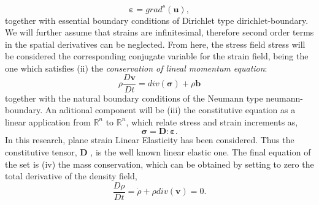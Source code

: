 \documentclass[preprint,12pt,a4paper]{elsarticle}
\newcommand{\vect}[1]{
  \ensuremath{\mathbf{{#1}}}
}
\newcommand{\tens}[1]{
  \ensuremath{\mathbf{{#1}}}
}
\newcommand{\Div}[1]{
  \ensuremath{div({#1})}
}
\newcommand\GradS[1]{grad^s({#1})}
\begin{document}
\begin{equation}
  \label{eq:Compatibility-equation}
  \tens{\varepsilon} = \GradS{\vect{u}},
\end{equation}
together with essential boundary conditions of Dirichlet type
\gls{dirichlet-boundary}. We will further assume that strains are
infinitesimal, therefore second order terms
in the spatial derivatives can be neglected. From here, the
stress field \gls{stress} will be considered the corresponding
conjugate variable for the strain field, being the one which
satisfies (ii) the \textit{conservation of lineal momentum equation}:
\begin{equation}
  \label{eq:Balance-momentum}
\rho \frac{D\vect{v}}{Dt} = \Div{\tens{\sigma}} + \rho \vect{b}
\end{equation}
together with the natural boundary conditions of the Neumann type \gls{neumann-boundary}.  An aditional component will be (iii) the constitutive equation as a linear
application from $\mathbb{R}^n$ to $\mathbb{R}^n$, which relate stress and strain increments as,
\begin{equation}
  \label{eq:Constitutive-equation}
\tens{\sigma} = \tens{D} \colon \tens{\varepsilon}.
\end{equation}
In this research, plane strain Linear Elasticity has been
  considered. Thus the constitutive tensor, \tens{D}, is the well
  known linear elastic one. The final equation of the set is (iv) the mass
conservation, which can be obtained by setting to zero the total derivative of the density field,
\begin{equation}
  \label{eq:Rho-material-derivative}
  \frac{D \rho}{D t} = \dot{\rho} + \rho \Div{\vect{v}} = 0.
\end{equation}
\end{document}
